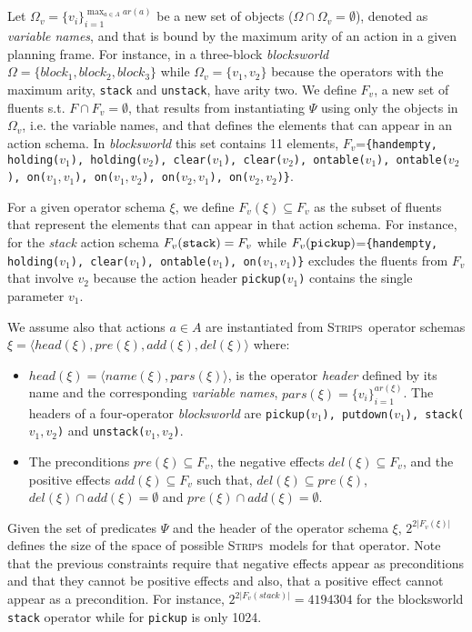 \documentclass[letterpaper]{article} %
\newcommand{\tup}[1]{{\langle #1 \rangle}}
\newcommand{\strips}{\textsc{Strips}}     %
\begin{document}
Let $\Omega_v=\{v_i\}_{i=1}^{\operatorname*{max}_{a\in A} ar(a)}$ be a new set of objects ($\Omega\cap\Omega_v=\emptyset$), denoted as {\em variable names}, and that is bound by the maximum arity of an action in a given planning frame. For instance, in a three-block {\em blocksworld} $\Omega=\{block_1, block_2, block_3\}$ while $\Omega_v=\{v_1, v_2\}$ because the operators with the maximum arity, {\small\tt stack} and {\small\tt unstack}, have arity two. We define $F_v$, a new set of fluents s.t. $F\cap F_v=\emptyset$, that results from instantiating $\Psi$ using only the objects in $\Omega_v$, i.e. the variable names, and that defines the elements that can appear in an action schema. In {\em blocksworld} this set contains 11 elements, $F_v$={\small\tt\{handempty, holding($v_1$), holding($v_2$), clear($v_1$), clear($v_2$), ontable($v_1$), ontable($v_2$), on($v_1,v_1$), on($v_1,v_2$), on($v_2,v_1$), on($v_2,v_2$)\}}.

For a given operator schema $\xi$, we define $F_v(\xi)\subseteq F_v$ as the subset of fluents that represent the elements that can appear in that action schema. For instance, for the {\em stack} action schema $F_v({\tt stack})=F_v$ while $F_v({\tt pickup})$={\small\tt\{handempty, holding($v_1$), clear($v_1$), ontable($v_1$), on($v_1,v_1$)\}} excludes the fluents from $F_v$ that involve $v_2$ because the action header {\small\tt pickup($v_1$)} contains the single parameter $v_1$.

We assume also that actions $a\in A$ are instantiated from \strips\ operator schemas $\xi=\tup{head(\xi),pre(\xi),add(\xi),del(\xi)}$ where:
\begin{itemize}
\item $head(\xi)=\tup{name(\xi),pars(\xi)}$, is the operator {\em header} defined by its name and the corresponding {\em variable names}, $pars(\xi)=\{v_i\}_{i=1}^{ar(\xi)}$. The headers of a four-operator {\em blocksworld} are {\small\tt pickup($v_1$), putdown($v_1$), stack($v_1,v_2$)} and {\small\tt unstack($v_1,v_2$)}.
\item The preconditions $pre(\xi)\subseteq F_v$, the negative effects $del(\xi)\subseteq F_v$, and the positive effects $add(\xi)\subseteq F_v$ such that, $del(\xi)\subseteq pre(\xi)$, $del(\xi)\cap add(\xi)=\emptyset$ and $pre(\xi)\cap add(\xi)=\emptyset$.
\end{itemize}
Given the set of predicates $\Psi$ and the header of the operator schema $\xi$, $2^{2|F_v(\xi)|}$ defines the size of the space of possible \strips\ models for that operator. Note that the previous constraints require that negative effects appear as preconditions and that they cannot be positive effects and also, that a positive effect cannot appear as a precondition. For instance, $2^{2|F_v(stack)|}=4194304$ for the blocksworld {\tt stack} operator while for {\tt pickup} is only 1024.
\end{document}

